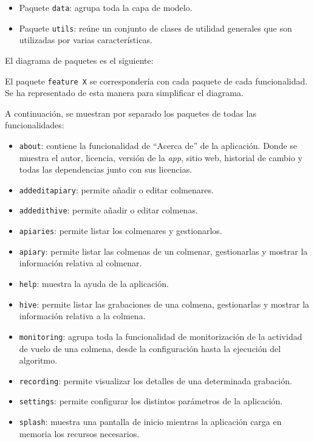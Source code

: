 \begin{itemize}
\tightlist
\item
  Paquete \texttt{data}: agrupa toda la capa de modelo.
\item
  Paquete \texttt{utils}: reúne un conjunto de clases de utilidad
  generales que son utilizadas por varias características.
\end{itemize}

El diagrama de paquetes es el siguiente:


El paquete \texttt{feature X} se correspondería con cada paquete de cada
funcionalidad. Se ha representado de esta manera para simplificar el
diagrama.

A continuación, se muestran por separado los paquetes de todas las
funcionalidades:


\begin{itemize}
\tightlist
\item
  \texttt{about}: contiene la funcionalidad de ``Acerca de'' de la
  aplicación. Donde se muestra el autor, licencia, versión de la
  \emph{app}, sitio web, historial de cambio y todas las dependencias
  junto con sus licencias.
\item
  \texttt{addeditapiary}: permite añadir o editar colmenares.
\item
  \texttt{addedithive}: permite añadir o editar colmenas.
\item
  \texttt{apiaries}: permite listar los colmenares y gestionarlos.
\item
  \texttt{apiary}: permite listar las colmenas de un colmenar,
  gestionarlas y mostrar la información relativa al colmenar.
\item
  \texttt{help}: muestra la ayuda de la aplicación.
\item
  \texttt{hive}: permite listar las grabaciones de una colmena,
  gestionarlas y mostrar la información relativa a la colmena.
\item
  \texttt{monitoring}: agrupa toda la funcionalidad de monitorización de
  la actividad de vuelo de una colmena, desde la configuración hasta la
  ejecución del algoritmo.
\item
  \texttt{recording}: permite visualizar los detalles de una determinada
  grabación.
\item
  \texttt{settings}: permite configurar los distintos parámetros de la
  aplicación.
\item
  \texttt{splash}: muestra una pantalla de inicio mientras la aplicación
  carga en memoria los recursos necesarios.
\end{itemize}

